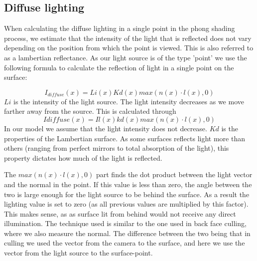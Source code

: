 \subsection{Diffuse lighting}
When calculating the diffuse lighting in a single point in the phong shading
process, we estimate that the intensity of the light that is reflected does not
vary depending on the position from which the point is viewed. This is also
referred to as a lambertian reflectance. As our light source is of the type
'point' we use the following formula to calculate the reflection of light in a
single point on the surface:

$$I_{diffuse}(x) = Li(x) Kd(x) max(n(x) · l(x), 0)$$ $Li$ is the intensity of
the light source. The light intensity decreases as we move farther away from
the source. This is calculated through $$Idiffuse(x) = Il(x) kd(x) max(n(x) ·
l(x), 0)$$
 In our model we assume that the light intensity does not decrease.
$Kd$ is the properties of the Lambertian surface. As some surfaces reflects
light more than others (ranging from perfect mirrors to total absorption of the
light), this property dictates how much of the light is reflected.

The $max(n(x) · l(x), 0)$ part finds the dot product between the light vector
and the normal in the point. If this value is less than zero, the angle between
the two is large enough for the light source to be behind the surface. As a
result the lighting value is set to zero (as all previous values are multiplied
by this factor). This makes sense, as as surface lit from behind would not
receive any direct illumination. The technique used is similar to the one used
in back face culling, where we also measure the normal. The difference between
the two being that in culling we used the vector from the camera to the
surface, and here we use the vector from the light source to the surface-point. 

